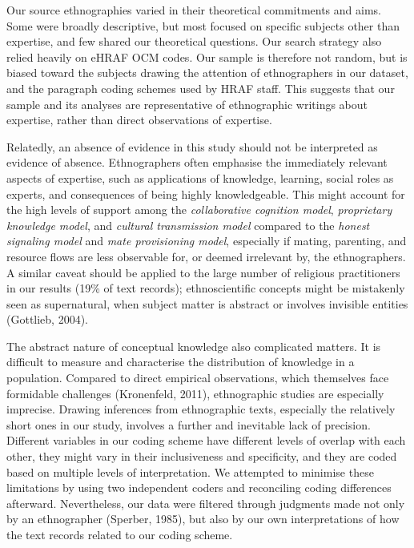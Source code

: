 \documentclass[
  11pt,
]{article}
\begin{document}
Our source ethnographies varied in their theoretical commitments and aims. Some were broadly descriptive, but most focused on specific subjects other than expertise, and few shared our theoretical questions. Our search strategy also relied heavily on eHRAF OCM codes. Our sample is therefore not random, but is biased toward the subjects drawing the attention of ethnographers in our dataset, and the paragraph coding schemes used by HRAF staff. This suggests that our sample and its analyses are representative of ethnographic writings about expertise, rather than direct observations of expertise.

Relatedly, an absence of evidence in this study should not be interpreted as evidence of absence. Ethnographers often emphasise the immediately relevant aspects of expertise, such as applications of knowledge, learning, social roles as experts, and consequences of being highly knowledgeable. This might account for the high levels of support among the \emph{collaborative cognition model}, \emph{proprietary knowledge model}, and \emph{cultural transmission model} compared to the \emph{honest signaling model} and \emph{mate provisioning model}, especially if mating, parenting, and resource flows are less observable for, or deemed irrelevant by, the ethnographers. A similar caveat should be applied to the large number of religious practitioners in our results (19\% of text records); ethnoscientific concepts might be mistakenly seen as supernatural, when subject matter is abstract or involves invisible entities (Gottlieb, 2004).

The abstract nature of conceptual knowledge also complicated matters. It is difficult to measure and characterise the distribution of knowledge in a population. Compared to direct empirical observations, which themselves face formidable challenges (Kronenfeld, 2011), ethnographic studies are especially imprecise. Drawing inferences from ethnographic texts, especially the relatively short ones in our study, involves a further and inevitable lack of precision. Different variables in our coding scheme have different levels of overlap with each other, they might vary in their inclusiveness and specificity, and they are coded based on multiple levels of interpretation. We attempted to minimise these limitations by using two independent coders and reconciling coding differences afterward. Nevertheless, our data were filtered through judgments made not only by an ethnographer (Sperber, 1985), but also by our own interpretations of how the text records related to our coding scheme.
\end{document}
